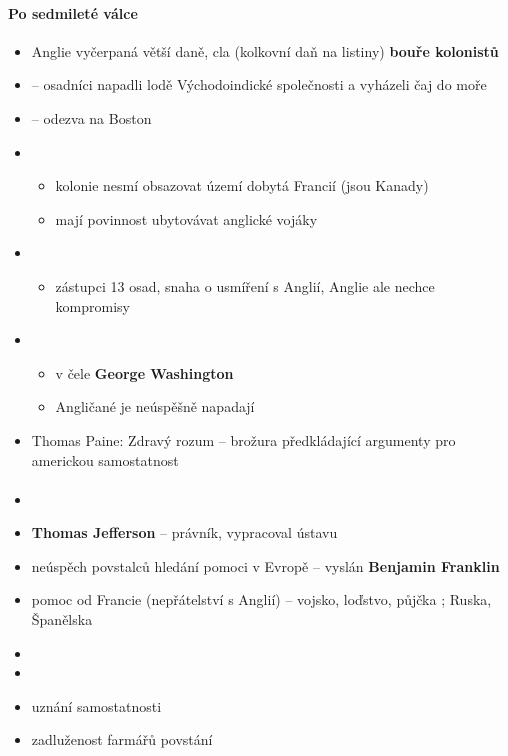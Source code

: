 \paragraph{Po sedmileté válce}
\begin{itemize}
\item Anglie vyčerpaná \ra větší daně, cla (kolkovní daň na listiny) \ra \textbf{bouře kolonistů}
\item {} -- osadníci napadli lodě Východoindické společnosti a vyházeli čaj do moře
\item {} -- odezva na Boston
\item {}
	\begin{itemize}
	\item kolonie nesmí obsazovat území dobytá Francií (jsou Kanady)
	\item mají povinnost ubytovávat anglické vojáky
	\end{itemize}
\item {}
	\begin{itemize}
	\item zástupci 13 osad, snaha o usmíření s Anglií, Anglie ale nechce kompromisy
	\end{itemize}
\item {}
	\begin{itemize}
	\item v čele\textbf{ George Washington}
	\item Angličané je neúspěšně napadají 
	\end{itemize}
\item Thomas Paine: Zdravý rozum -- brožura předkládající argumenty pro americkou samostatnost	
\end{itemize}

\paragraph{}
\begin{itemize}
\item {}
\item \textbf{Thomas Jefferson} -- právník, vypracoval ústavu
\item neúspěch povstalců \ra hledání pomoci v Evropě -- vyslán \textbf{Benjamin Franklin}
\item pomoc od Francie (nepřátelství s Anglií) -- vojsko, loďstvo, půjčka ; Ruska, Španělska
\item {}
\item {}
\item {} \ra uznání samostatnosti
\item zadluženost farmářů \ra povstání
\end{itemize}

